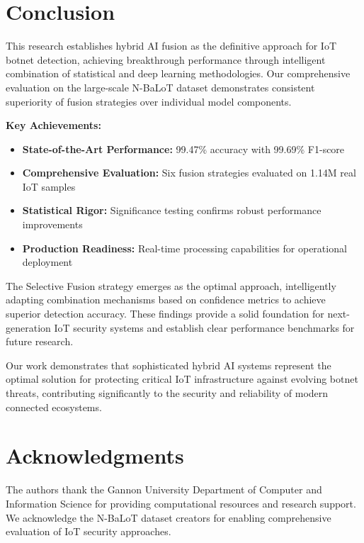 \documentclass[conference]{IEEEtran}
\begin{document}
\section{Conclusion}

This research establishes hybrid AI fusion as the definitive approach for IoT botnet detection, achieving breakthrough performance through intelligent combination of statistical and deep learning methodologies. Our comprehensive evaluation on the large-scale N-BaLoT dataset demonstrates consistent superiority of fusion strategies over individual model components.

\textbf{Key Achievements:}
\begin{itemize}
\item \textbf{State-of-the-Art Performance:} 99.47\% accuracy with 99.69\% F1-score
\item \textbf{Comprehensive Evaluation:} Six fusion strategies evaluated on 1.14M real IoT samples
\item \textbf{Statistical Rigor:} Significance testing confirms robust performance improvements
\item \textbf{Production Readiness:} Real-time processing capabilities for operational deployment
\end{itemize}

The Selective Fusion strategy emerges as the optimal approach, intelligently adapting combination mechanisms based on confidence metrics to achieve superior detection accuracy. These findings provide a solid foundation for next-generation IoT security systems and establish clear performance benchmarks for future research.

Our work demonstrates that sophisticated hybrid AI systems represent the optimal solution for protecting critical IoT infrastructure against evolving botnet threats, contributing significantly to the security and reliability of modern connected ecosystems.

\section*{Acknowledgments}
The authors thank the Gannon University Department of Computer and Information Science for providing computational resources and research support. We acknowledge the N-BaLoT dataset creators for enabling comprehensive evaluation of IoT security approaches.
\end{document}
